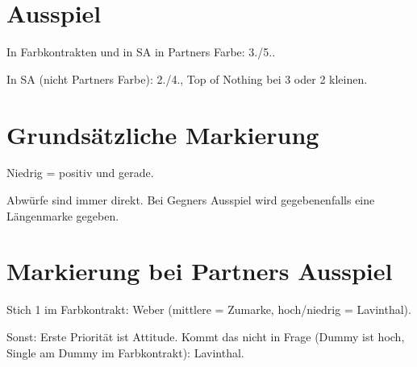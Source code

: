 \section{Ausspiel}
In Farbkontrakten und in SA in Partners Farbe: 3./5..

In SA (nicht Partners Farbe): 2./4., Top of Nothing bei 3 oder 2 kleinen.

\section{Grundsätzliche Markierung}
Niedrig = positiv und gerade.

Abwürfe sind immer direkt. Bei Gegners Ausspiel wird gegebenenfalls eine Längenmarke gegeben.

\section{Markierung bei Partners Ausspiel}
Stich 1 im Farbkontrakt: Weber (mittlere = Zumarke, hoch/niedrig = Lavinthal).

Sonst: Erste Priorität ist Attitude. Kommt das nicht in Frage (Dummy ist hoch, Single am Dummy im Farbkontrakt): Lavinthal.
